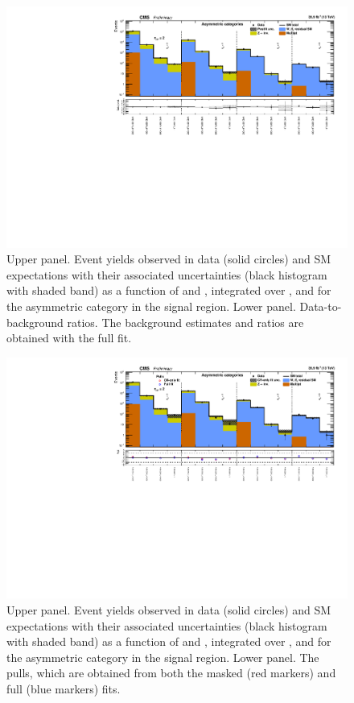 \clearpage
\begin{figure}[h!]
  \centering
  \caption{Upper panel. Event yields observed in data (solid circles)
    and SM expectations with their associated uncertainties (black
    histogram with shaded band) as a function of \nb and \scalht,
    integrated over \mht, and for the asymmetric \njet category
    in the signal region. Lower panel. Data-to-background ratios. The
    background estimates and ratios are obtained with the full fit. }
  \label{fig:mr_asym_post}
  \includegraphics[width=1.\linewidth]{figures/results/36invfb/asym/summaryPlot_Asymmetric_fit_b}
\end{figure}

\clearpage
\begin{figure}[h!]
  \centering
  \caption{Upper panel. Event yields observed in data (solid circles)
    and SM expectations with their associated uncertainties (black
    histogram with shaded band) as a function of \nb and \scalht,
    integrated over \mht, and for the asymmetric \njet category
    in the signal region. Lower panel. The pulls, which are obtained
    from both the masked (red markers) and full (blue markers) fits. }
  \label{fig:mr_asym_pulls}
  \includegraphics[width=1.\linewidth]{figures/results/36invfb/asym/summaryPlot_Asymmetric_prefit_overlay_fit_b}
\end{figure}

